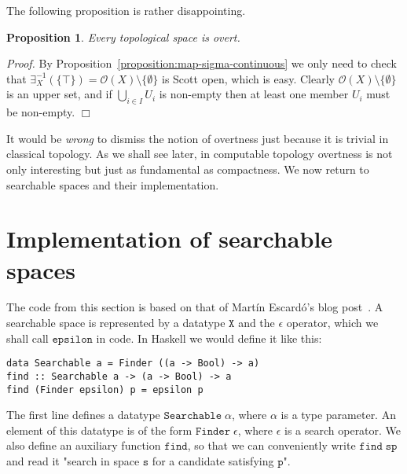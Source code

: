 \documentclass[a4paper,10pt]{article}
\newtheorem{proposition}[theorem]{Proposition}
\newenvironment{proof}{\par\noindent\textit{Proof.}}{\hfill$\Box$\par\medskip}
\newcommand{\set}[1]{\{#1\}}
\newcommand{\tpl}[1]{\mathcal{O}(#1)}
\newcommand{\R}[1]{\mathtt{#1}}
\begin{document}
The following proposition is rather disappointing.

\begin{proposition} Every topological space is overt.
\end{proposition}

\begin{proof} By Proposition~\ref{proposition:map-sigma-continuous} we only need to check that $\exists_X^{-1}(\set{\top}) = \tpl{X} \setminus \set{\emptyset}$ is Scott open, which is easy. Clearly $\tpl{X} \setminus \set{\emptyset}$ is an upper set, and if $\bigcup_{i \in I} U_i$ is non-empty then at least one member $U_i$ must be non-empty.
\end{proof}

It would be \emph{wrong} to dismiss the notion of overtness just because it is trivial in classical topology. As we shall see later, in computable topology overtness is not only interesting but just as fundamental as compactness. We now return to searchable spaces and their implementation.

\section{Implementation of searchable spaces}
\label{sec:implementation-searchable}

The code from this section is based on that of Martín Escardó's blog post~\cite{escardo08:blog}. A searchable space is represented by a datatype $\mathtt{X}$ and the $\epsilon$ operator, which we shall call $\R{epsilon}$ in code. In Haskell we would define it like this:
%
\begin{lstlisting}
data Searchable a = Finder ((a -> Bool) -> a)
find :: Searchable a -> (a -> Bool) -> a
find (Finder epsilon) p = epsilon p
\end{lstlisting}
%
The first line defines a datatype $\mathtt{Searchable}\;\alpha$, where $\alpha$ is a type parameter. An element of this datatype is of the form $\mathtt{Finder}\;\epsilon$, where $\epsilon$ is a search operator. We also define an auxiliary function $\mathtt{find}$, so that we can conveniently write $\R{find}\;\R{s}\R{p}$ and read it "search in space $\R{s}$ for a candidate satisfying $\R{p}$".
\end{document}
